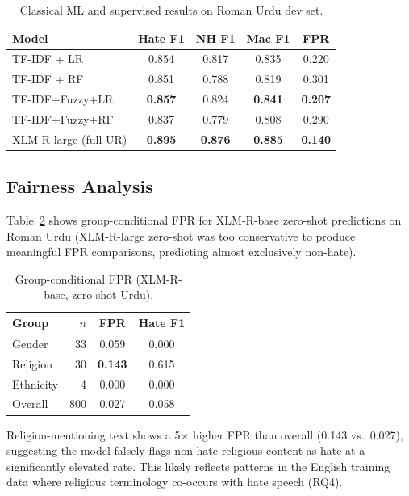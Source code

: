 \documentclass{article}
\begin{document}
\begin{table}[h]
\centering
\caption{Classical ML and supervised results on Roman Urdu dev set.}
\label{tab:classical_results}
\vskip 0.05in
\begin{small}
\begin{tabular}{lcccc}
\toprule
Model & Hate F1 & NH F1 & Mac F1 & FPR \\
\midrule
TF-IDF + LR           & 0.854 & 0.817 & 0.835 & 0.220 \\
TF-IDF + RF           & 0.851 & 0.788 & 0.819 & 0.301 \\
TF-IDF+Fuzzy+LR       & \textbf{0.857} & 0.824 & \textbf{0.841} & \textbf{0.207} \\
TF-IDF+Fuzzy+RF       & 0.837 & 0.779 & 0.808 & 0.290 \\
\midrule
XLM-R-large (full UR) & \textbf{0.895} & \textbf{0.876} & \textbf{0.885} & \textbf{0.140} \\
\bottomrule
\end{tabular}
\end{small}
\end{table}

\subsection{Fairness Analysis}

Table~\ref{tab:fairness} shows group-conditional FPR for XLM-R-base zero-shot
predictions on Roman Urdu (XLM-R-large zero-shot was too conservative to produce
meaningful FPR comparisons, predicting almost exclusively non-hate).

\begin{table}[h]
\centering
\caption{Group-conditional FPR (XLM-R-base, zero-shot Urdu).}
\label{tab:fairness}
\vskip 0.05in
\begin{small}
\begin{tabular}{lrcc}
\toprule
Group & $n$ & FPR & Hate F1 \\
\midrule
Gender    &  33 & 0.059 & 0.000 \\
Religion  &  30 & \textbf{0.143} & 0.615 \\
Ethnicity &   4 & 0.000 & 0.000 \\
Overall   & 800 & 0.027 & 0.058 \\
\bottomrule
\end{tabular}
\end{small}
\end{table}

Religion-mentioning text shows a 5$\times$ higher FPR than overall (0.143
vs.\ 0.027), suggesting the model falsely flags non-hate religious content as
hate at a significantly elevated rate.
This likely reflects patterns in the English training data where religious
terminology co-occurs with hate speech (RQ4).
\end{document}
